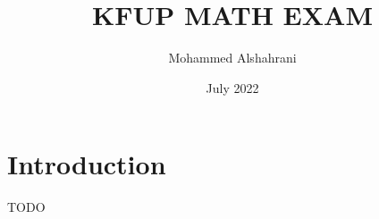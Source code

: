 \documentclass{article}
\title{KFUP MATH EXAM}
\author{ Mohammed Alshahrani}
\date{July 2022}
\begin{document}
\maketitle

\section{Introduction}
TODO
\end{document}
